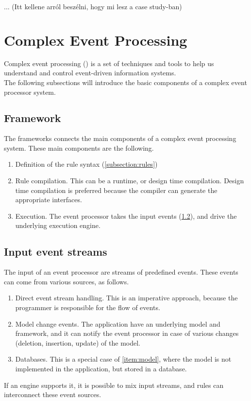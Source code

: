 ... (Itt kellene arról beszélni, hogy mi lesz a case study-ban)

\section{Complex Event Processing}

Complex event processing (\cep) is a set of techniques and tools to help us understand and control event-driven information systems.\citep{Luckham:2001:PEI:515781}
\\[2ex]
The following subsections will introduce the basic components of a complex event processor system.
\subsection{Framework}
The frameworks connects the main components of a complex event processing system. These main components are the following.
\begin{enumerate}
	\item Definition of the rule syntax (\cref{subsection:rules})
	\item Rule compilation. This can be a runtime, or design time compilation. Design time compilation is preferred because the compiler can generate the appropriate interfaces.
	\item Execution. The event processor takes the input events (\cref{subsection:event_streams}), and drive the underlying execution engine.
\end{enumerate}

\subsection{Input event streams}
\label{subsection:event_streams}
The input of an event processor are streams of predefined events. These events can come from various sources, as follows.
\begin{enumerate}
	\item Direct event stream handling. This is an imperative approach, because the programmer is responsible for the flow of events.
	\item\label{item:model} Model change events. The application have an underlying model and framework, and it can notify the event processor in case of various changes (deletion, insertion, update) of the model.
	\item Databases. This is a special case of \cref{item:model}, where the model is not implemented in the application, but stored in a database.
\end{enumerate}
\vspace{1ex}
If an engine supports it, it is possible to mix input streams, and rules can interconnect these event sources.

